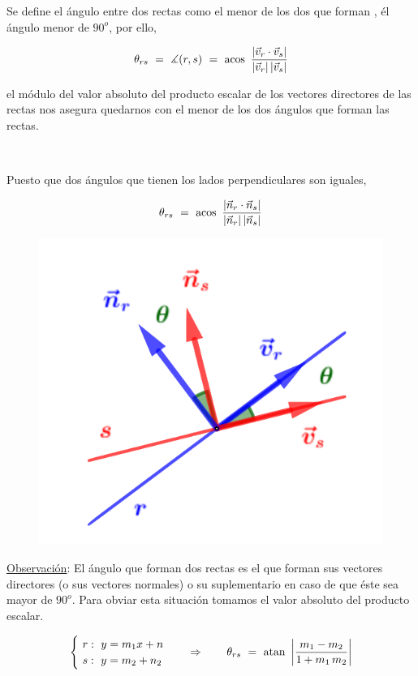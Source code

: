 \vspace{5mm}
\begin{definition}

Se define el ángulo entre dos rectas como el menor de los dos que forman	, él ángulo menor de $90^o$, por ello, 

$$\theta_{rs} \ = \ \measuredangle (r,s) \ = \ \acos\ \dfrac{|\vec v_r \cdot \vec v_s|}{|\vec v_r| \, |\vec v_s|}$$

\begin{small}\textcolor{gris}{el módulo del valor absoluto del producto escalar de los vectores directores de las rectas nos asegura quedarnos con el menor de los dos ángulos que forman las rectas.}\end{small}
\end{definition}

\vspace{5mm}
\begin{definition}

\begin{multicols}{2}

$\ $

Puesto que dos ángulos que tienen los lados perpendiculares son iguales, 

$$\theta_{rs} \ = \ \acos\ \dfrac{|\vec n_r \cdot \vec n_s|}{|\vec n_r| \, |\vec n_s|}$$

\begin{figure}[H]
	\centering
	\includegraphics[width=.3\textwidth]{img-ga/ga19.png}
\end{figure}
\end{multicols}
\end{definition}

\underline{Observación}: El ángulo que forman dos rectas es el que forman sus vectores directores (o sus vectores normales) o su suplementario en caso de que éste sea mayor de $90^o$. Para obviar esta situación tomamos el valor absoluto del producto escalar.

\begin{theorem} 

	$$\begin{cases} \ r:\ y=m_1x+n \\ \ s:\ y=m_2+n_2 \end{cases} \quad \Rightarrow \qquad \theta_{rs} \ = \ \atan \ \left| \dfrac{m_1-m_2}{1+m_1\, m_2}  \right| $$
\end{theorem}

